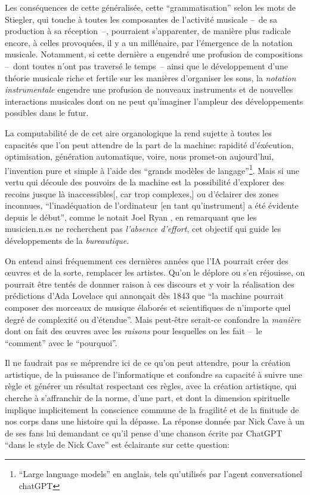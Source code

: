 Les conséquences de cette  généralisée, cette ``grammatisation'' selon les mots de Stiegler, qui touche à toutes les composantes de l'activité musicale --~de sa production à sa réception~--, pourraient s'apparenter, de manière plus radicale encore, à celles provoquées, il y a un millénaire, par l'émergence de la notation musicale. Notamment, si cette dernière a engendré une profusion de compositions --~dont toutes n'ont pas traversé le temps~-- ainsi que le développement d'une théorie musicale riche et fertile sur les manières d'organiser les sons, la \textit{notation instrumentale} engendre une profusion de nouveaux instruments et de nouvelles interactions musicales dont on ne peut qu'imaginer l'ampleur des développements possibles dans le futur.

La computabilité de de cet aire organologique la rend sujette à toutes les capacités que l'on peut attendre de la part de la machine: rapidité d'éxécution, optimisation, génération automatique, voire, nous promet-on aujourd'hui, l'invention pure et simple à l'aide des ``grands modèles de langage''\footnote{``Large language models'' en anglais, tels qu'utilisés par l'agent conversationel chatGPT}. Mais si une vertu qui découle des pouvoirs de la machine est la possibilité d'explorer des recoins jusque là inaccessibles[, car trop complexes,] ou d'éclairer des zones inconnues, ``l'inadéquation de l'ordinateur [en tant qu'instrument] a été évidente depuis le début'', comme le notait Joel Ryan \cite{ryan_remarks_1991}, en remarquant que les musicien.n.es ne recherchent pas \textit{l'absence d'effort}, cet objectif qui guide les développements de la \textit{bureautique}.

On entend ainsi fréquemment ces dernières années que l'IA pourrait créer des œuvres et de la sorte, remplacer les artistes. Qu'on le déplore ou s'en réjouisse, on pourrait être tentés de donnner raison à ces discours et y voir la réalisation des prédictions d'Ada Lovelace qui annonçait dès 1843 que ``la machine pourrait composer des morceaux de musique élaborés et scientifiques de n’importe quel degré de complexité ou d’étendue''\cite{lovelace_translators_1843}. Mais peut-être serait-ce confondre la \textit{manière} dont on fait des œuvres avec les \textit{raisons} pour lesquelles on les fait --~le ``comment'' avec le ``pourquoi''.

Il ne faudrait pas se méprendre ici de ce qu'on peut attendre, pour la création artistique, de la puissance de l'informatique et confondre sa capacité à suivre une règle et générer un résultat respectant ces règles, avec la création artistique, qui cherche à s'affranchir de la norme, d'une part, et dont la dimension spirituelle implique implicitement la conscience commune de la fragilité et de la finitude de nos corps dans une histoire qui la dépasse. La réponse donnée par Nick Cave à un de ses fans lui demandant ce qu'il pense d'une chanson écrite par ChatGPT ``dans le style de Nick Cave'' est éclairante sur cette question:

